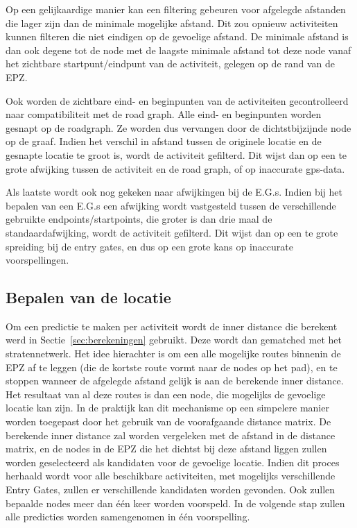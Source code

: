 Op een gelijkaardige manier kan een filtering gebeuren voor afgelegde afstanden
die lager zijn dan de minimale mogelijke afstand. Dit zou opnieuw activiteiten
kunnen filteren die niet eindigen op de gevoelige afstand. De minimale afstand
is dan ook degene tot de node met de laagste minimale afstand tot deze node
vanaf het zichtbare startpunt/eindpunt van de activiteit, gelegen op de rand
van de \ac{EPZ}.

Ook worden de zichtbare eind- en beginpunten van de activiteiten gecontrolleerd
naar compatibiliteit met de road graph. Alle eind- en beginpunten worden
gesnapt op de roadgraph. Ze worden dus vervangen door de dichtstbijzijnde node
op de graaf. Indien het verschil in afstand tussen de originele locatie en de
gesnapte locatie te groot is, wordt de activiteit gefilterd. Dit wijst dan op
een te grote afwijking tussen de activiteit en de road graph, of op inaccurate
gps-data.

Als laatste wordt ook nog gekeken naar afwijkingen bij de \acp{E.G.}. Indien
bij het bepalen van een \acp{E.G.} een afwijking wordt vastgesteld tussen de
verschillende gebruikte endpoints/startpoints, die groter is dan drie maal de
standaardafwijking, wordt de activiteit gefilterd. Dit wijst dan op een te
grote spreiding bij de entry gates, en dus op een grote kans op inaccurate
voorspellingen.

\subsection{Bepalen van de locatie}
Om een predictie te maken per activiteit wordt de inner distance die berekent
werd in Sectie~\ref{sec:berekeningen} gebruikt. Deze wordt dan gematched met
het stratennetwerk. Het idee hierachter is om een alle mogelijke routes
binnenin de \ac{EPZ} af te leggen (die de kortste route vormt naar de nodes op
het pad), en te stoppen wanneer de afgelegde afstand gelijk is aan de berekende
inner distance. Het resultaat van al deze routes is dan een node, die mogelijks
de gevoelige locatie kan zijn. In de praktijk kan dit mechanisme op een
simpelere manier worden toegepast door het gebruik van de voorafgaande distance
matrix. De berekende inner distance zal worden vergeleken met de afstand in de
distance matrix, en de nodes in de \ac{EPZ} die het dichtst bij deze afstand
liggen zullen worden geselecteerd als kandidaten voor de gevoelige locatie.
Indien dit proces herhaald wordt voor alle beschikbare activiteiten, met
mogelijks verschillende Entry Gates, zullen er verschillende kandidaten worden
gevonden. Ook zullen bepaalde nodes meer dan één keer worden voorspeld. In de
volgende stap zullen alle predicties worden samengenomen in één voorspelling.

